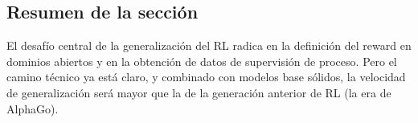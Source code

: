 \subsection{Resumen de la sección}

El desafío central de la generalización del RL radica en la definición del reward en dominios abiertos y en la obtención de datos de supervisión de proceso. Pero el camino técnico ya está claro, y combinado con modelos base sólidos, la velocidad de generalización será mayor que la de la generación anterior de RL (la era de AlphaGo).

